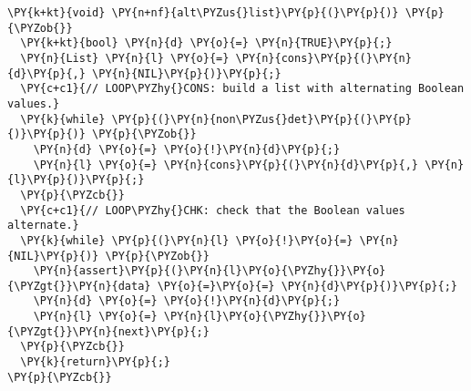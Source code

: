 \begin{Verbatim}[commandchars=\\\{\},codes={\catcode`\$=3\catcode`\^=7\catcode`\_=8}]
\PY{k+kt}{void} \PY{n+nf}{alt\PYZus{}list}\PY{p}{(}\PY{p}{)} \PY{p}{\PYZob{}}
  \PY{k+kt}{bool} \PY{n}{d} \PY{o}{=} \PY{n}{TRUE}\PY{p}{;}
  \PY{n}{List} \PY{n}{l} \PY{o}{=} \PY{n}{cons}\PY{p}{(}\PY{n}{d}\PY{p}{,} \PY{n}{NIL}\PY{p}{)}\PY{p}{;}
  \PY{c+c1}{// LOOP\PYZhy{}CONS: build a list with alternating Boolean values.}
  \PY{k}{while} \PY{p}{(}\PY{n}{non\PYZus{}det}\PY{p}{(}\PY{p}{)}\PY{p}{)} \PY{p}{\PYZob{}}
    \PY{n}{d} \PY{o}{=} \PY{o}{!}\PY{n}{d}\PY{p}{;}
    \PY{n}{l} \PY{o}{=} \PY{n}{cons}\PY{p}{(}\PY{n}{d}\PY{p}{,} \PY{n}{l}\PY{p}{)}\PY{p}{;}
  \PY{p}{\PYZcb{}}
  \PY{c+c1}{// LOOP\PYZhy{}CHK: check that the Boolean values alternate.}
  \PY{k}{while} \PY{p}{(}\PY{n}{l} \PY{o}{!}\PY{o}{=} \PY{n}{NIL}\PY{p}{)} \PY{p}{\PYZob{}}
    \PY{n}{assert}\PY{p}{(}\PY{n}{l}\PY{o}{\PYZhy{}}\PY{o}{\PYZgt{}}\PY{n}{data} \PY{o}{=}\PY{o}{=} \PY{n}{d}\PY{p}{)}\PY{p}{;}
    \PY{n}{d} \PY{o}{=} \PY{o}{!}\PY{n}{d}\PY{p}{;}
    \PY{n}{l} \PY{o}{=} \PY{n}{l}\PY{o}{\PYZhy{}}\PY{o}{\PYZgt{}}\PY{n}{next}\PY{p}{;}
  \PY{p}{\PYZcb{}}
  \PY{k}{return}\PY{p}{;}
\PY{p}{\PYZcb{}}
\end{Verbatim}
